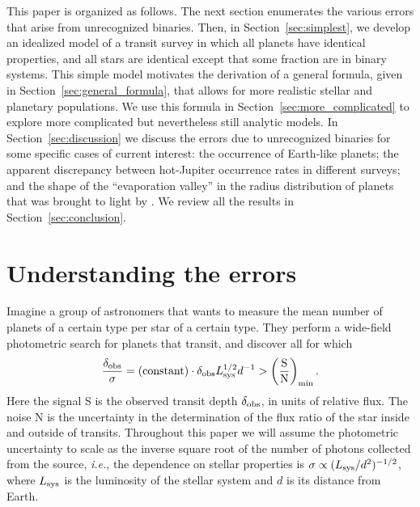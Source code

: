 \documentclass[12pt,modern]{aastex61}
\begin{document}
This paper is organized as follows.  The next section enumerates the
various errors that arise from unrecognized binaries.  Then, in
Section~\ref{sec:simplest}, we develop an idealized model of a transit
survey in which all planets have identical properties, and all stars
are identical except that some fraction are in binary systems.  This
simple model motivates the derivation of a general formula, given in
Section~\ref{sec:general_formula}, that allows for more realistic
stellar and planetary populations.  We use this formula in
Section~\ref{sec:more_complicated} to explore more complicated but
nevertheless still analytic models.  In Section~\ref{sec:discussion}
we discuss the errors due to unrecognized binaries for some specific
cases of current interest: the occurrence of Earth-like planets; the
apparent discrepancy between hot-Jupiter occurrence rates in different
surveys; and the shape of the ``evaporation valley'' in the radius
distribution of planets that was brought to light by
\citet{fulton_california-_2017}.  We review all the results in
Section~\ref{sec:conclusion}.


\section{Understanding the errors}
\label{sec:concept}

Imagine a group of astronomers that wants to measure the mean number of
planets of a certain type per star of a certain type.  They perform a
wide-field photometric search for planets that transit, and discover
all for which
\begin{equation}
\frac{\delta_{\rm obs}}{\sigma}
  = ({\rm constant}) \cdot \delta_{\rm obs} L_{\rm sys}^{1/2} d^{-1}
> \left(\frac{{\rm S}}{{\rm N}}\right)_{\rm min}.
\label{eq:S_N_thresh}
\end{equation}
Here the signal S is the observed transit depth $\delta_{\rm obs}$, in
units of relative flux.
The noise N is the uncertainty in the
determination of the flux ratio of the star inside and outside of
transits.  Throughout this paper we will assume the photometric
uncertainty to scale as the inverse square root of the number of
photons collected from the source, {\it i.e.}, the dependence on
stellar properties is $\sigma \propto (L_{\rm sys}/d^2)^{-1/2}$, where
$L_{\rm sys}$ is the luminosity of the stellar system and $d$ is its
distance from Earth.
\end{document}
